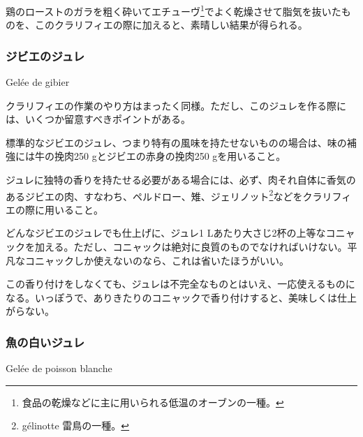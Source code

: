 \begin{recette}
鶏のローストのガラを粗く砕いてエチューヴ\footnote{食品の乾燥などに主に用いられる低温のオーブンの一種。}でよく乾燥させて脂気を抜いたものを、このクラリフィエの際に加えると、素晴しい結果が得られる。

\atoaki{}

\hypertarget{gelee-de-gibier}{%
\subsubsection{ジビエのジュレ}\label{gelee-de-gibier}}

\begin{frsubenv}

Gelée de gibier

\end{frsubenv}


クラリフィエの作業のやり方はまったく同様。ただし、このジュレを作る際には、いくつか留意すべきポイントがある。

標準的なジビエのジュレ、つまり特有の風味を持たせないものの場合は、味の補強には牛の挽肉250
gとジビエの赤身の挽肉250 gを用いること。

ジュレに独特の香りを持たせる必要がある場合には、必ず、肉それ自体に香気のあるジビエの肉、すなわち、ペルドロー、雉、ジェリノット\footnote{gélinotte
  雷鳥の一種。}などをクラリフィエの際に用いること。

どんなジビエのジュレでも仕上げに、ジュレ1
Lあたり大さじ2杯の上等なコニャックを加える。ただし、コニャックは絶対に良質のものでなければいけない。平凡なコニャックしか使えないのなら、これは省いたほうがいい。

この香り付けをしなくても、ジュレは不完全なものとはいえ、一応使えるものになる。いっぽうで、ありきたりのコニャックで香り付けすると、美味しくは仕上がらない。

\atoaki{}

\hypertarget{gelee-de-poisson-blanche}{%
\subsubsection{魚の白いジュレ}\label{gelee-de-poisson-blanche}}

\begin{frsubenv}

Gelée de poisson blanche


\end{frsubenv}
\end{recette}
